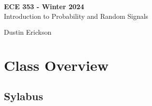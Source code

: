 \documentclass[11pt,fleqn,openany]{book} %
\begin{document}

\begingroup
\thispagestyle{empty}
\centering
\vspace*{5cm}
\par\normalfont\fontsize{35}{35}\sffamily\selectfont
\textbf{ECE 353 - Winter 2024}\\
{\LARGE Introduction to Probability and Random Signals}\par %
\vspace*{1cm}
{\Huge Dustin Erickson}\par %
\endgroup



\pagestyle{empty} %

\tableofcontents %


\pagestyle{fancy} %


\chapter{Class Overview}
\section{Sylabus}
\end{document}
